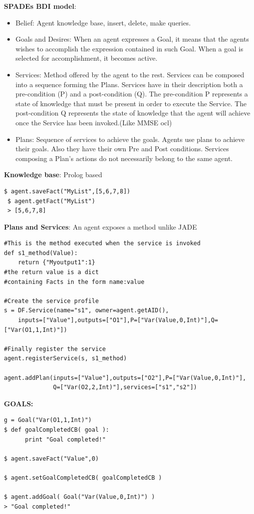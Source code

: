 \documentclass[a4paper, 11pt]{article}
\begin{document}
\noindent \textbf{SPADEs BDI model}:
\begin{itemize}
	\item Belief: Agent knowledge base, insert, delete, make queries.
	\item Goals and Desires: When an agent expresses a Goal, it means that the agents wishes to accomplish the expression contained in such Goal. When a goal is selected for accomplishment, it becomes active.
	\item Services: Method offered by the agent to the rest. Services can be composed into a sequence forming the Plans. Services have in their description both a pre-condition (P) and a post-condition (Q). The pre-condition P represents a state of knowledge that must be present in order to execute the Service. The post-condition Q represents the state of knowledge that the agent will achieve once the Service has been invoked.(Like MMSE ocl)
	\item Plans: Sequence of services to achieve the goals. Agents use plans to achieve their goals. Also they have their own Pre and Post conditions. Services composing a Plan's actions do not necessarily belong to the same agent.
\end{itemize}

\noindent \textbf{Knowledge base}: Prolog based \\
\begin{Verbatim}[xleftmargin=.2in]
 $ agent.saveFact("MyList",[5,6,7,8])
 $ agent.getFact("MyList")
 > [5,6,7,8]
\end{Verbatim}

\noindent \textbf{Plans and Services}: An agent exposes a method unlike JADE \\
\begin{Verbatim}[xleftmargin=.2in]
#This is the method executed when the service is invoked
def s1_method(Value):
    return {"Myoutput1":1} 
#the return value is a dict 
#containing Facts in the form name:value

#Create the service profile
s = DF.Service(name="s1", owner=agent.getAID(),
    inputs=["Value"],outputs=["O1"],P=["Var(Value,0,Int)"],Q=["Var(O1,1,Int)"])

#Finally register the service
agent.registerService(s, s1_method)

agent.addPlan(inputs=["Value"],outputs=["O2"],P=["Var(Value,0,Int)"],
			  Q=["Var(O2,2,Int)"],services=["s1","s2"])
\end{Verbatim}

\noindent \textbf{GOALS:} \\
\begin{Verbatim}[xleftmargin=.2in]
g = Goal("Var(O1,1,Int)")
$ def goalCompletedCB( goal ):
      print "Goal completed!"

$ agent.saveFact("Value",0)

$ agent.setGoalCompletedCB( goalCompletedCB )

$ agent.addGoal( Goal("Var(Value,0,Int)") )
> "Goal completed!"
\end{Verbatim}
\end{document}
